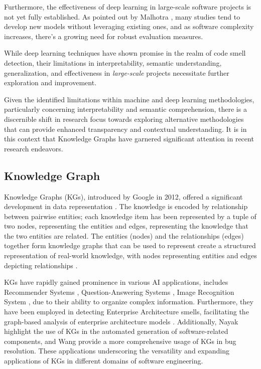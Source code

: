 Furthermore, the effectiveness of deep learning in large-scale software projects is not yet fully established. As pointed out by Malhotra \etal\cite{Malhotra_Jain_Kessentini_2023}, many studies tend to develop new models without leveraging existing ones, and as software complexity increases, there's a growing need for robust evaluation measures.

While deep learning techniques have shown promise in the realm of code smell detection, their limitations in interpretability, semantic understanding, generalization, and effectiveness in \textit{large-scale} projects necessitate further exploration and improvement.

Given the identified limitations within machine and deep learning methodologies, particularly concerning interpretability and semantic comprehension, there is a discernible shift in research focus towards exploring alternative methodologies that can provide enhanced transparency and contextual understanding. It is in this context that Knowledge Graphs have garnered significant attention in recent research endeavors.

\subsection{Knowledge Graph}
Knowledge Graphs (KGs), introduced by Google in 2012, offered a significant development in data representation \cite{Singhal_2012}. The knowledge is encoded by relationship between pairwise entities; each knowledge item has been represented by a tuple of two nodes, representing the entities and edges, representing the knowledge that the two entities are related. The entities (nodes) and the relationships (edges) together form knowledge graphs that can be used to represent create a structured representation of real-world knowledge, with nodes representing entities and edges depicting relationships \cite{Hogan_2021}. 

KGs have rapidly gained prominence in various AI applications, includes Recommender Systems \cite{Guo_Zhuang_Qin_Zhu_Xie_Xiong_He_2022}, Question-Answering Systems \cite{Huang_Zhang_Li_Li_2019}, Image Recognition System \cite{Chen_Xie_Wang_Li_2021}, due to their ability to organize complex information. Furthermore, they have been employed in detecting Enterprise Architecture smells, facilitating the graph-based analysis of enterprise architecture models \cite{Smajevic_Hacks_Bork_2021}. Additionally, Nayak \etal \cite{Nayak_Kesri_Dubey_2020} highlight the use of KGs in the automated generation of software-related components, and Wang \etal \cite{Wang_Sun_Wang_Duan_Li_2017} provide a more comprehensive usage of KGs in bug resolution. These applications underscoring the versatility and expanding applications of KGs in different domains of software engineering.


